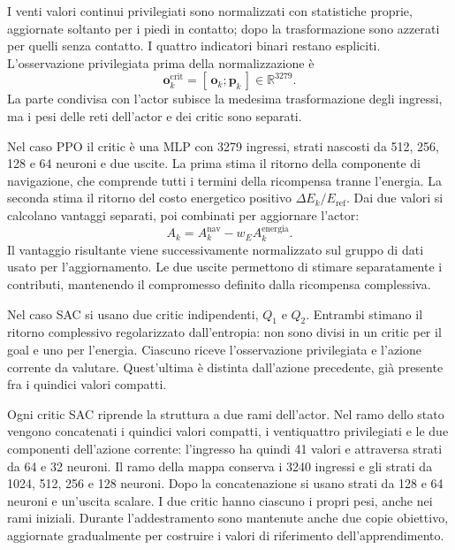 I venti valori continui privilegiati sono normalizzati con statistiche proprie, aggiornate soltanto per i piedi in contatto; dopo la trasformazione sono azzerati per quelli senza contatto. I quattro indicatori binari restano espliciti. L'osservazione privilegiata prima della normalizzazione è
\begin{equation}
    \mathbf o_k^{\mathrm{crit}}=[\,\mathbf o_k;\mathbf p_k\,]
       \in\mathbb R^{3279}.
    \label{eq:metodo-osservazione-critic}
\end{equation}
La parte condivisa con l'actor subisce la medesima trasformazione degli ingressi, ma i pesi delle reti dell'actor e dei critic sono separati.

Nel caso PPO il critic è una MLP con 3279 ingressi, strati nascosti da 512, 256, 128 e 64 neuroni e due uscite. La prima stima il ritorno della componente di navigazione, che comprende tutti i termini della ricompensa tranne l'energia. La seconda stima il ritorno del costo energetico positivo $\Delta E_k/E_{\mathrm{ref}}$. Dai due valori si calcolano vantaggi separati, poi combinati per aggiornare l'actor:
\begin{equation}
    A_k=A_k^{\mathrm{nav}}-w_E A_k^{\mathrm{energia}}.
    \label{eq:metodo-vantaggio-combinato}
\end{equation}
Il vantaggio risultante viene successivamente normalizzato sul gruppo di dati usato per l'aggiornamento. Le due uscite permettono di stimare separatamente i contributi, mantenendo il compromesso definito dalla ricompensa complessiva.

Nel caso SAC si usano due critic indipendenti, $Q_1$ e $Q_2$. Entrambi stimano il ritorno complessivo regolarizzato dall'entropia: non sono divisi in un critic per il goal e uno per l'energia. Ciascuno riceve l'osservazione privilegiata e l'azione corrente da valutare. Quest'ultima è distinta dall'azione precedente, già presente fra i quindici valori compatti.

Ogni critic SAC riprende la struttura a due rami dell'actor. Nel ramo dello stato vengono concatenati i quindici valori compatti, i ventiquattro privilegiati e le due componenti dell'azione corrente: l'ingresso ha quindi 41 valori e attraversa strati da 64 e 32 neuroni. Il ramo della mappa conserva i 3240 ingressi e gli strati da 1024, 512, 256 e 128 neuroni. Dopo la concatenazione si usano strati da 128 e 64 neuroni e un'uscita scalare. I due critic hanno ciascuno i propri pesi, anche nei rami iniziali. Durante l'addestramento sono mantenute anche due copie obiettivo, aggiornate gradualmente per costruire i valori di riferimento dell'apprendimento.


